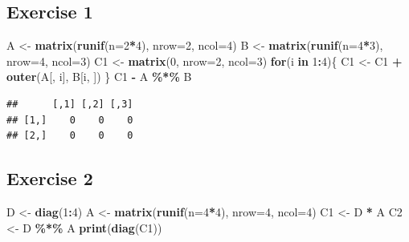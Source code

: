 \documentclass[
]{book}
\newenvironment{Shaded}{\begin{snugshade}}{\end{snugshade}}
\newcommand{\ControlFlowTok}[1]{\textcolor[rgb]{0.13,0.29,0.53}{\textbf{#1}}}
\newcommand{\DataTypeTok}[1]{\textcolor[rgb]{0.13,0.29,0.53}{#1}}
\newcommand{\DecValTok}[1]{\textcolor[rgb]{0.00,0.00,0.81}{#1}}
\newcommand{\KeywordTok}[1]{\textcolor[rgb]{0.13,0.29,0.53}{\textbf{#1}}}
\newcommand{\NormalTok}[1]{#1}
\newcommand{\OperatorTok}[1]{\textcolor[rgb]{0.81,0.36,0.00}{\textbf{#1}}}
\newcommand{\StringTok}[1]{\textcolor[rgb]{0.31,0.60,0.02}{#1}}
\begin{document}
\hypertarget{exercise-1-2}{%
\subsection*{Exercise 1}\label{exercise-1-2}}

\begin{Shaded}
\begin{Highlighting}[]
\NormalTok{A \textless{}{-}}\StringTok{ }\KeywordTok{matrix}\NormalTok{(}\KeywordTok{runif}\NormalTok{(}\DataTypeTok{n=}\DecValTok{2}\OperatorTok{*}\DecValTok{4}\NormalTok{), }\DataTypeTok{nrow=}\DecValTok{2}\NormalTok{, }\DataTypeTok{ncol=}\DecValTok{4}\NormalTok{)}
\NormalTok{B \textless{}{-}}\StringTok{ }\KeywordTok{matrix}\NormalTok{(}\KeywordTok{runif}\NormalTok{(}\DataTypeTok{n=}\DecValTok{4}\OperatorTok{*}\DecValTok{3}\NormalTok{), }\DataTypeTok{nrow=}\DecValTok{4}\NormalTok{, }\DataTypeTok{ncol=}\DecValTok{3}\NormalTok{)}
\NormalTok{C1 \textless{}{-}}\StringTok{ }\KeywordTok{matrix}\NormalTok{(}\DecValTok{0}\NormalTok{, }\DataTypeTok{nrow=}\DecValTok{2}\NormalTok{, }\DataTypeTok{ncol=}\DecValTok{3}\NormalTok{)}
\ControlFlowTok{for}\NormalTok{(i }\ControlFlowTok{in} \DecValTok{1}\OperatorTok{:}\DecValTok{4}\NormalTok{)\{}
\NormalTok{  C1 \textless{}{-}}\StringTok{ }\NormalTok{C1 }\OperatorTok{+}\StringTok{ }\KeywordTok{outer}\NormalTok{(A[, i], B[i, ])}
\NormalTok{\}}
\NormalTok{C1 }\OperatorTok{{-}}\StringTok{ }\NormalTok{A }\OperatorTok{\%*\%}\StringTok{ }\NormalTok{B}
\end{Highlighting}
\end{Shaded}

\begin{verbatim}
##      [,1] [,2] [,3]
## [1,]    0    0    0
## [2,]    0    0    0
\end{verbatim}

\hypertarget{exercise-2-2}{%
\subsection*{Exercise 2}\label{exercise-2-2}}

\begin{Shaded}
\begin{Highlighting}[]
\NormalTok{D \textless{}{-}}\StringTok{ }\KeywordTok{diag}\NormalTok{(}\DecValTok{1}\OperatorTok{:}\DecValTok{4}\NormalTok{)}
\NormalTok{A \textless{}{-}}\StringTok{ }\KeywordTok{matrix}\NormalTok{(}\KeywordTok{runif}\NormalTok{(}\DataTypeTok{n=}\DecValTok{4}\OperatorTok{*}\DecValTok{4}\NormalTok{), }\DataTypeTok{nrow=}\DecValTok{4}\NormalTok{, }\DataTypeTok{ncol=}\DecValTok{4}\NormalTok{)}
\NormalTok{C1 \textless{}{-}}\StringTok{ }\NormalTok{D }\OperatorTok{*}\StringTok{ }\NormalTok{A}
\NormalTok{C2 \textless{}{-}}\StringTok{ }\NormalTok{D }\OperatorTok{\%*\%}\StringTok{ }\NormalTok{A}
\KeywordTok{print}\NormalTok{(}\KeywordTok{diag}\NormalTok{(C1))}
\end{Highlighting}
\end{Shaded}
\end{document}
